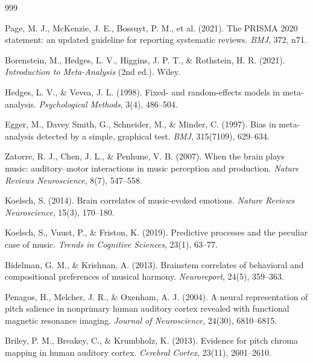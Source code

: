 \documentclass[9pt,onecolumn]{article}
\begin{document}

\begin{thebibliography}{999}
\fontsize{5}{6}\selectfont


Page, M. J., McKenzie, J. E., Bossuyt, P. M., et al. (2021). The PRISMA 2020 statement: an updated guideline for reporting systematic reviews. \textit{BMJ}, 372, n71.

Borenstein, M., Hedges, L. V., Higgins, J. P. T., \& Rothstein, H. R. (2021). \textit{Introduction to Meta-Analysis} (2nd ed.). Wiley.

Hedges, L. V., \& Vevea, J. L. (1998). Fixed- and random-effects models in meta-analysis. \textit{Psychological Methods}, 3(4), 486--504.

Egger, M., Davey Smith, G., Schneider, M., \& Minder, C. (1997). Bias in meta-analysis detected by a simple, graphical test. \textit{BMJ}, 315(7109), 629--634.

Zatorre, R. J., Chen, J. L., \& Penhune, V. B. (2007). When the brain plays music: auditory--motor interactions in music perception and production. \textit{Nature Reviews Neuroscience}, 8(7), 547--558.

Koelsch, S. (2014). Brain correlates of music-evoked emotions. \textit{Nature Reviews Neuroscience}, 15(3), 170--180.

Koelsch, S., Vuust, P., \& Friston, K. (2019). Predictive processes and the peculiar case of music. \textit{Trends in Cognitive Sciences}, 23(1), 63--77.

Bidelman, G. M., \& Krishnan, A. (2013). Brainstem correlates of behavioral and compositional preferences of musical harmony. \textit{Neuroreport}, 24(5), 359--363.

Penagos, H., Melcher, J. R., \& Oxenham, A. J. (2004). A neural representation of pitch salience in nonprimary human auditory cortex revealed with functional magnetic resonance imaging. \textit{Journal of Neuroscience}, 24(30), 6810--6815.

Briley, P. M., Breakey, C., \& Krumbholz, K. (2013). Evidence for pitch chroma mapping in human auditory cortex. \textit{Cerebral Cortex}, 23(11), 2601--2610.


\end{thebibliography}
\end{document}
